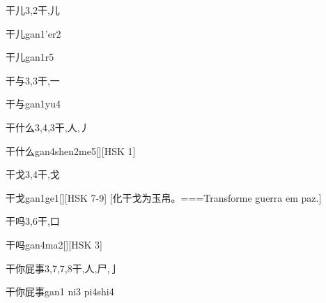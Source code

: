 \begin{Entry}{干儿}{3,2}{⼲,⼉}
  \begin{Phonetics}{干儿}{gan1'er2}
  \end{Phonetics}
  \begin{Phonetics}{干儿}{gan1r5}
  \end{Phonetics}
\end{Entry}

\begin{Entry}{干与}{3,3}{⼲,⼀}
  \begin{Phonetics}{干与}{gan1yu4}
  \end{Phonetics}
\end{Entry}

\begin{Entry}{干什么}{3,4,3}{⼲,⼈,⼃}
  \begin{Phonetics}{干什么}{gan4shen2me5}[][HSK 1]
  \end{Phonetics}
\end{Entry}

\begin{Entry}{干戈}{3,4}{⼲,⼽}
  \begin{Phonetics}{干戈}{gan1ge1}[][HSK 7-9]
    [化干戈为玉帛。===Transforme guerra em paz.]
  \end{Phonetics}
\end{Entry}

\begin{Entry}{干吗}{3,6}{⼲,⼝}
  \begin{Phonetics}{干吗}{gan4ma2}[][HSK 3]
  \end{Phonetics}
\end{Entry}

\begin{Entry}{干你屁事}{3,7,7,8}{⼲,⼈,⼫,⼅}
  \begin{Phonetics}{干你屁事}{gan1 ni3 pi4shi4}
  \end{Phonetics}
\end{Entry}

